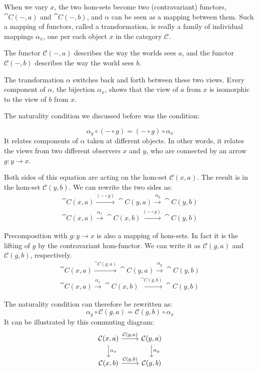 \documentclass[DaoFP]{subfiles}
\begin{document}
When we vary $x$, the two hom-sets become two (contravariant) functors, $\cat C(-, a)$ and $\cat C(-, b)$, and $\alpha$ can be seen as a mapping between them. Such a mapping of functors, called a transformation, is really a family of individual mappings $\alpha_x$, one per each object $x$ in the category $\mathcal{C}$. 

The functor $\mathcal{C}(-, a)$ describes the way the worlds sees $a$, and the functor $\mathcal{C}(-, b)$ describes the way the world sees $b$. 

The transformation $\alpha$ switches back and forth between these two views. Every component of $\alpha$, the bijection $\alpha_x$, shows that the view of $a$ from $x$ is isomorphic to the view of $b$ from $x$. 

The naturality condition we discussed before was the condition:

\[ \alpha_y \circ (- \circ g) = (- \circ g) \circ \alpha_x \]
It relates components of $\alpha$ taken at different objects. In other words, it relates the views from two different observers $x$ and $y$, who are connected by an arrow $g \colon y \to x$. 

Both sides of this equation are acting on the hom-set $\mathcal{C}(x, a)$. The result is in the hom-set $\mathcal{C}(y, b)$. We can rewrite the two sides as:
\begin{align*}
 \cat C(x, a) \xrightarrow{(- \circ g)} \cat C(y, a) \xrightarrow{\alpha_y} \cat C(y, b) \\
\cat C(x, a) \xrightarrow{\alpha_x}  \cat C(x, b)  \xrightarrow{(- \circ g)}\cat C(y, b)
\end{align*}

Precomposition with $g \colon y \to x$ is also a mapping of hom-sets. In fact it is the lifting of $g$ by the contravariant hom-functor. We can write it as $\mathcal{C}(g, a)$ and $\mathcal{C}(g, b)$, respectively.
\begin{align*}
 \cat C(x, a) \xrightarrow{\cat C(g, a)} \cat C(y, a) \xrightarrow{\alpha_y} \cat C(y, b) \\
\cat C(x, a) \xrightarrow{\alpha_x}  \cat C(x, b)  \xrightarrow{\cat C(g, b)}\cat C(y, b)
\end{align*}

The naturality condition can therefore be rewritten as:
\[ \alpha_y \circ \mathcal{C}(g, a) = \mathcal{C}(g, b) \circ \alpha_x \]
It can be illustrated by this commuting diagram:
\[
 \begin{tikzcd}
 \mathcal{C}(x, a)
 \arrow[d, "\alpha_x"]
 \arrow[r, "{\mathcal{C}(g, a)}"]
 &
 \mathcal{C}(y, a)
  \arrow[d, "\alpha_y"]
 \\
 \mathcal{C}(x, b)
 \arrow[r, "{\mathcal{C}(g, b)}"]
& \mathcal{C}(y, b)
 \end{tikzcd}
\]
\end{document}
